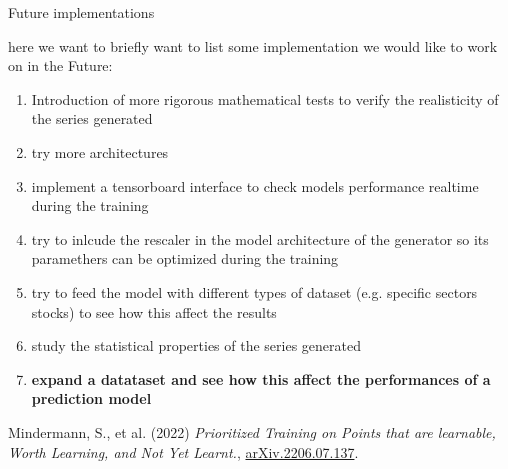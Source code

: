\documentclass{article}
\begin{document}
    \newpage
    \begin{center}
        {\huge{Future implementations}}
    \end{center} 
    here we want to briefly want to list some implementation we would like to work on in the Future:
    \begin{enumerate}
        \item Introduction of more rigorous mathematical tests to verify the realisticity of the series generated
        \item try more architectures
        \item implement a tensorboard interface to check models performance realtime during the training
        \item try to inlcude the rescaler in the model architecture of the generator so its paramethers can be optimized during the training
        \item try to feed the model with different types of dataset (e.g. specific sectors stocks) to see how this affect the results
        \item study the statistical properties of the series generated
        \item \textbf{expand a datataset and see how this affect the performances of a prediction model} 
    \end{enumerate}

    
    \begin{thebibliography}{9}
        Mindermann, S., et al. (2022) \emph{Prioritized Training on Points that are learnable, Worth Learning, and Not Yet Learnt.}, \href{https://doi.org/10.48550/arXiv.2206.07137}{arXiv.2206.07.137}.
        
        \bibitem{}

\end{thebibliography}
\end{document}
